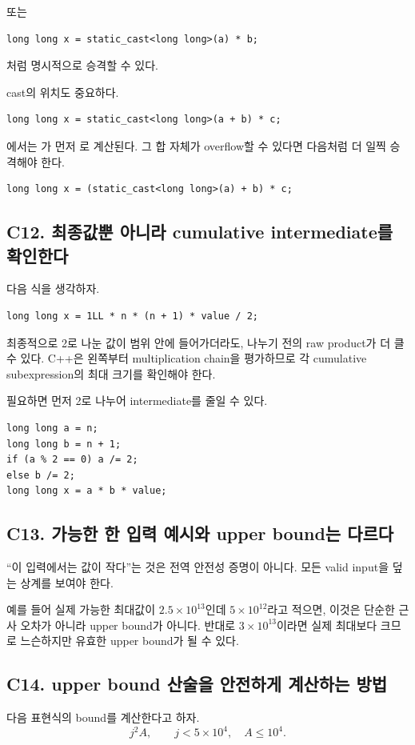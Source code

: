 또는
\begin{lstlisting}
long long x = static_cast<long long>(a) * b;
\end{lstlisting}
처럼 명시적으로 승격할 수 있다.

cast의 위치도 중요하다.
\begin{lstlisting}
long long x = static_cast<long long>(a + b) * c;
\end{lstlisting}
에서는 가 먼저 로 계산된다. 그 합 자체가 overflow할 수 있다면 다음처럼 더 일찍 승격해야 한다.
\begin{lstlisting}
long long x = (static_cast<long long>(a) + b) * c;
\end{lstlisting}

\subsection{C12. 최종값뿐 아니라 cumulative intermediate를 확인한다}
다음 식을 생각하자.
\begin{lstlisting}
long long x = 1LL * n * (n + 1) * value / 2;
\end{lstlisting}

최종적으로 2로 나눈 값이  범위 안에 들어가더라도, 나누기 전의 raw product가 더 클 수 있다. C++은 왼쪽부터 multiplication chain을 평가하므로 각 cumulative subexpression의 최대 크기를 확인해야 한다.

필요하면 먼저 2로 나누어 intermediate를 줄일 수 있다.
\begin{lstlisting}
long long a = n;
long long b = n + 1;
if (a % 2 == 0) a /= 2;
else b /= 2;
long long x = a * b * value;
\end{lstlisting}

\subsection{C13. 가능한 한 입력 예시와 upper bound는 다르다}
``이 입력에서는 값이 작다''는 것은 전역 안전성 증명이 아니다. 모든 valid input을 덮는 상계를 보여야 한다.

예를 들어 실제 가능한 최대값이 $2.5\times10^{13}$인데 $5\times10^{12}$라고 적으면, 이것은 단순한 근사 오차가 아니라 upper bound가 아니다. 반대로 $3\times10^{13}$이라면 실제 최대보다 크므로 느슨하지만 유효한 upper bound가 될 수 있다.

\subsection{C14. upper bound 산술을 안전하게 계산하는 방법}
다음 표현식의 bound를 계산한다고 하자.
\[
j^2A,\qquad j<5\times10^4,\quad A\le10^4.
\]

